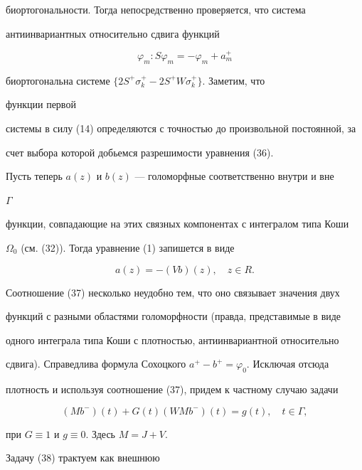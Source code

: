 биортогональности. Тогда непосредственно проверяется, что система 


антиинвариантных относительно сдвига функций 


\begin{equation} 


\varphi_m:S\varphi_m=-\varphi_m+a^+_m 


\end{equation} 


биортогональна системе $\{2S^+\sigma^+_k-2S^+W\sigma^+_k\}$. Заметим, что 


функции первой 


системы в силу (14) определяются с точностью до произвольной постоянной, за 


счет выбора которой добьемся разрешимости уравнения (36). 


 


Пусть теперь $a(z)$ и $b(z)$ --- голоморфные соответственно внутри и вне 


$\Gamma$ 


функции, совпадающие на этих связных компонентах с интегралом типа Коши 


$\Omega_0$ (см. (32)). Тогда уравнение (1) запишется в виде 


\begin{equation} 


a(z)=-(Vb)(z),\quad z\in R. 


\end{equation} 


Соотношение (37) несколько неудобно тем, что оно связывает значения двух 


функций с разными областями голоморфности (правда, представимые в виде 


одного интеграла типа Коши с плотностью, антиинвариантной относительно 


сдвига). Справедлива формула Сохоцкого $a^+-b^+=\varphi_0$. Исключая отсюда 


плотность и используя соотношение (37), придем к частному случаю задачи 


\begin{equation} 


(Mb^-)(t)+G(t)(WMb^-)(t)=g(t),\quad t\in\Gamma, 


\end{equation} 


при $G\equiv1$ и $g\equiv0$. Здесь $M=J+V$. 


Задачу (38) трактуем как внешнюю 


